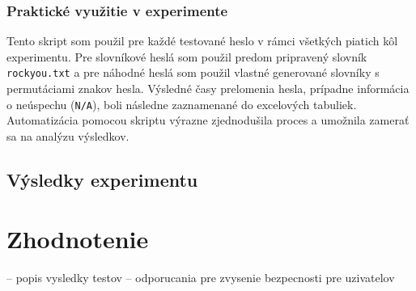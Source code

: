 \documentclass[12pt, twoside]{book}
\begin{document}
\subsubsection{Praktické využitie v experimente} Tento skript som použil pre každé testované heslo v rámci všetkých piatich kôl experimentu. Pre slovníkové heslá som použil predom pripravený slovník \texttt{rockyou.txt} a pre náhodné heslá som použil vlastné generované slovníky s permutáciami znakov hesla. Výsledné časy prelomenia hesla, prípadne informácia o neúspechu (\texttt{N/A}), boli následne zaznamenané do excelových tabuliek. Automatizácia pomocou skriptu výrazne zjednodušila proces a umožnila zamerať sa na analýzu výsledkov.


\subsection{Výsledky experimentu}


\section{Zhodnotenie}
-- popis vysledky testov
-- odporucania pre zvysenie bezpecnosti pre uzivatelov



\makeatletter
{}
\makeatother

{}


 



\end{document}
